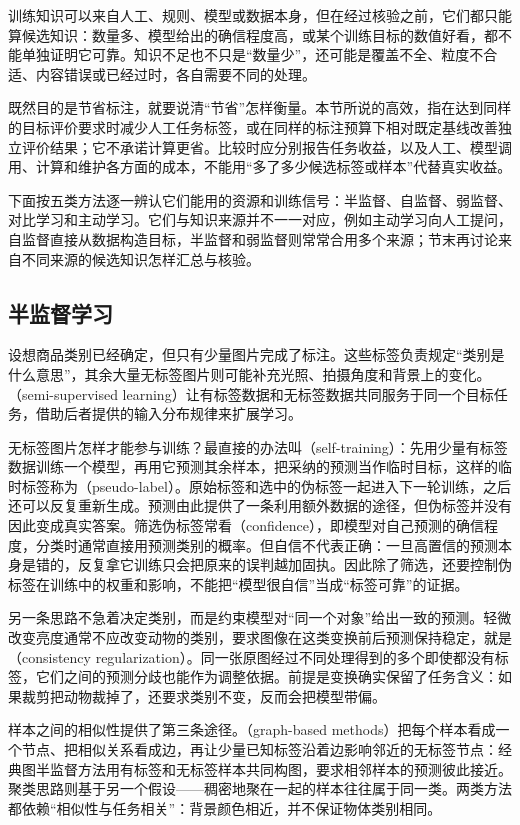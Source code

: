 训练知识可以来自人工、规则、模型或数据本身，但在经过核验之前，它们都只能算候选知识：数量多、模型给出的确信程度高，或某个训练目标的数值好看，都不能单独证明它可靠。知识不足也不只是“数量少”，还可能是覆盖不全、粒度不合适、内容错误或已经过时，各自需要不同的处理。

既然目的是节省标注，就要说清“节省”怎样衡量。本节所说的高效，指在达到同样的目标评价要求时减少人工任务标签，或在同样的标注预算下相对既定基线改善独立评价结果；它不承诺计算更省。比较时应分别报告任务收益，以及人工、模型调用、计算和维护各方面的成本，不能用“多了多少候选标签或样本”代替真实收益。

下面按五类方法逐一辨认它们能用的资源和训练信号：半监督、自监督、弱监督、对比学习和主动学习。它们与知识来源并不一一对应，例如主动学习向人工提问，自监督直接从数据构造目标，半监督和弱监督则常常合用多个来源；节末再讨论来自不同来源的候选知识怎样汇总与核验。

\subsection{半监督学习}
\label{sec:semi-supervised-learning}

设想商品类别已经确定，但只有少量图片完成了标注。这些标签负责规定“类别是什么意思”，其余大量无标签图片则可能补充光照、拍摄角度和背景上的变化。（semi-supervised learning）让有标签数据和无标签数据共同服务于同一个目标任务，借助后者提供的输入分布规律来扩展学习。

无标签图片怎样才能参与训练？最直接的办法叫（self-training）：先用少量有标签数据训练一个模型，再用它预测其余样本，把采纳的预测当作临时目标，这样的临时标签称为（pseudo-label）。原始标签和选中的伪标签一起进入下一轮训练，之后还可以反复重新生成。预测由此提供了一条利用额外数据的途径，但伪标签并没有因此变成真实答案。筛选伪标签常看（confidence），即模型对自己预测的确信程度，分类时通常直接用预测类别的概率。但自信不代表正确：一旦高置信的预测本身是错的，反复拿它训练只会把原来的误判越加固执。因此除了筛选，还要控制伪标签在训练中的权重和影响，不能把“模型很自信”当成“标签可靠”的证据。

另一条思路不急着决定类别，而是约束模型对“同一个对象”给出一致的预测。轻微改变亮度通常不应改变动物的类别，要求图像在这类变换前后预测保持稳定，就是（consistency regularization）。同一张原图经过不同处理得到的多个即使都没有标签，它们之间的预测分歧也能作为调整依据。前提是变换确实保留了任务含义：如果裁剪把动物裁掉了，还要求类别不变，反而会把模型带偏。

样本之间的相似性提供了第三条途径。（graph-based methods）把每个样本看成一个节点、把相似关系看成边，再让少量已知标签沿着边影响邻近的无标签节点：经典图半监督方法用有标签和无标签样本共同构图，要求相邻样本的预测彼此接近。聚类思路则基于另一个假设——稠密地聚在一起的样本往往属于同一类。两类方法都依赖“相似性与任务相关”：背景颜色相近，并不保证物体类别相同。


